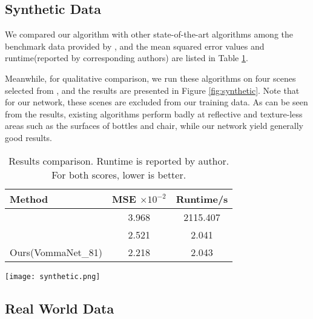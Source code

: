 \documentclass[10pt,twocolumn,letterpaper]{article}
\begin{document}
\subsection{Synthetic Data}

We compared our algorithm with other state-of-the-art algorithms among the benchmark data provided by \cite{honauer2016dataset}, and the mean squared error values and runtime(reported by corresponding authors) are listed in Table \ref{table:results}.

Meanwhile, for qualitative comparison, we run these algorithms on four scenes selected from \cite{alperovich2018light}, and the results are presented in Figure \ref{fig:synthetic}. Note that for our network, these scenes are excluded from our training data. As can be seen from the results, existing algorithms perform badly at reflective and texture-less areas such as the surfaces of bottles and chair, while our network yield generally good results.

\begin{table}
	\begin{center}
		\begin{tabular}{|l|c|c|}
			\hline
			Method & MSE $\times10^{-2}$ & Runtime/s \\
			\hline\hline
			\cite{zhang2016robust} & 3.968 & 2115.407\\
			\cite{shin2018epinet} & 2.521 & 2.041\\
			Ours(VommaNet\_81) & 2.218 & 2.043\\
			\hline
		\end{tabular}
	\end{center}
	\caption{Results comparison. Runtime is reported by author. For both scores, lower is better.}
	\label{table:results}
\end{table}

\begin{figure*}
	\begin{center}
		\texttt{[image: synthetic.png]}
	\end{center}
	\caption{Synthetic data results. (a)central view (b)ground truth (c)\cite{shin2018epinet} (d)\cite{zhang2016robust} (e)\cite{jeon2015accurate} (f)Ours(VommaNet\_81)}
	\label{fig:synthetic}
\end{figure*}

\subsection{Real World Data}
\end{document}
